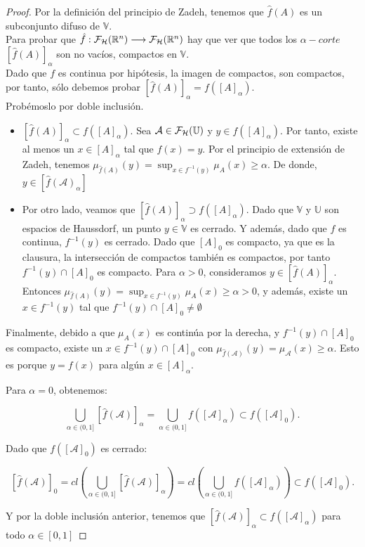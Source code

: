 \begin{proof}
	Por la definición del principio de Zadeh, tenemos que $\hat{f}(A)$ es un subconjunto difuso de $\mathbb{V}$. \\
	Para probar que $\hat{f} : \mathcal{F}_\mathcal{H}(\mathbb R^n) \longrightarrow \mathcal{F}_\mathcal{H}(\mathbb R^n)$ hay que ver que todos los $\alpha-corte$ $[\hat{f}(A)]_\alpha$ son no vacíos, compactos en $\mathbb{V}$. \\
	Dado que $f$ es continua por hipótesis, la imagen de compactos, son compactos, por tanto, sólo debemos probar $[\hat{f}(A)]_\alpha = f([A]_\alpha)$. \\
	Probémoslo por doble inclusión.
	
	\begin{itemize}
		\item $[\hat{f}(A)]_\alpha \subset f([A]_\alpha)$. Sea $\mathcal{A} \in \mathcal{F}_\mathcal{H}(\mathbb U)$ y $y \in f([A]_\alpha)$. Por tanto, existe al menos un $x \in [A]_\alpha$ tal que $f(x)=y$. Por el principio de extensión de Zadeh, tenemos $\mu_{\hat{f}(A)}(y)=\sup_{x\in f^{-1}(y)} \mu_A(x) \geq \alpha$. De donde, $y \in [\hat{f}(\mathcal{A})_\alpha]$
		\item Por otro lado, veamos que $[\hat{f}(A)]_\alpha \supset f([A]_\alpha)$. Dado que $\mathbb{V}$ y $\mathbb{U}$ son espacios de Haussdorf, un punto $y \in \mathbb{V}$ es cerrado. Y además, dado que $f$ es continua, $f^{-1}(y)$ es cerrado. Dado que $[A]_0$ es compacto, ya que es la clausura, la intersección de compactos también es compactos, por tanto $f^{-1}(y) \cap [A]_0$ es compacto. Para $\alpha>0$, consideramos $y \in [\hat{f}(A)]_\alpha$. Entonces $\mu_{\hat{f}(A)}(y)=\sup_{x\in f^{-1}(y)} \mu_A(x) \geq \alpha>0$, y además, existe un $x\in f^{-1}(y)$ tal que $f^{-1}(y) \cap [A]_0 \neq \emptyset$
	\end{itemize}
	Finalmente, debido a que $\mu_A(x)$ es continúa por la derecha, y $f^{-1}(y) \cap [A]_0$ es compacto, existe un $x \in f^{-1}(y) \cap [A]_0$ con $\mu_{\hat{f}(\mathcal{A})}(y)=\mu_{\mathcal{A}}(x) \geq \alpha$. Esto es porque $y=f(x)$ para algún $x \in [A]_\alpha$.
	
	Para $\alpha=0$, obtenemos:
	
	$$
	\bigcup_{\alpha \in (0, 1]} [\hat{f}(\mathcal{A})]_\alpha = \bigcup_{\alpha \in (0, 1]} f([\mathcal{A}]_\alpha) \subset f([\mathcal{A}]_0).
	$$
	
	Dado que $f([\mathcal{A}]_0)$ es cerrado:
	
	$$
	[\hat{f}(\mathcal{A})]_0 = cl\left( \bigcup_{\alpha \in (0, 1]} [\hat{f}(\mathcal{A})]_\alpha  \right) = cl\left(\bigcup_{\alpha \in (0, 1]} f([\mathcal{A}]_\alpha) \right)	\subset f([\mathcal{A}]_0).
	$$
	
	Y por la doble inclusión anterior, tenemos que $[\hat{f}(\mathcal{A})]_\alpha \subset f([\mathcal{A}]_\alpha)$ para todo $\alpha \in [0, 1]$
\end{proof}


